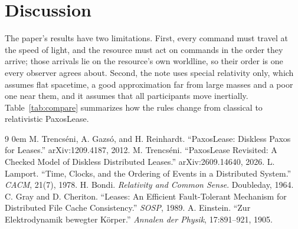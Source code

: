 \documentclass[final,5p,times,twocolumn,number]{elsarticle}
\newcommand{\tabref}[1]{Table~\ref*{#1}}
\begin{document}

\section{Discussion}\label{sec:discussion}\label{sec:limitations}

The paper's results have two limitations.  First, every command must travel at the speed of light, and the resource must act on commands in the order they arrive; those arrivals lie on the resource's own worldline, so their order is one every observer agrees about.  Second, the note uses special relativity only, which assumes flat spacetime, a good approximation far from large masses and a poor one near them, and it assumes that all participants move inertially.  \tabref{tab:compare} summarizes how the rules change from classical to relativistic PaxosLease.


\begin{thebibliography}{9}
\itemsep0em
 M. Trencs\'eni, A. Gazs\'o, and H. Reinhardt. ``PaxosLease: Diskless Paxos for Leases.'' arXiv:1209.4187, 2012.
 M. Trencs\'eni. ``PaxosLease Revisited: A Checked Model of Diskless Distributed Leases.'' arXiv:2609.14640, 2026.
 L. Lamport. ``Time, Clocks, and the Ordering of Events in a Distributed System.'' \textit{CACM}, 21(7), 1978.
 H. Bondi. \textit{Relativity and Common Sense}. Doubleday, 1964.
 C. Gray and D. Cheriton. ``Leases: An Efficient Fault-Tolerant Mechanism for Distributed File Cache Consistency.'' \textit{SOSP}, 1989.
 A. Einstein. ``Zur Elektrodynamik bewegter K\"orper.'' \textit{Annalen der Physik}, 17:891--921, 1905.
\end{thebibliography}
\end{document}
